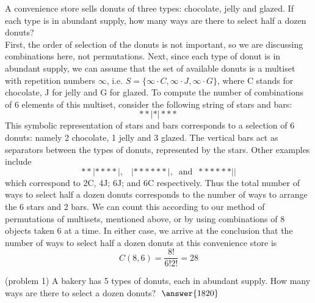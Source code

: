 \documentclass[handout]{ximera}
\begin{document}
\begin{example}[example 1]
A convenience store sells donuts of three types: chocolate, jelly and glazed.  If each type is in abundant supply,
how many ways are there to select half a dozen donuts?\\
First, the order of selection of the donuts is not important, so we are discussing combinations here, not permutations.
Next, since each type of donut is in abundant supply, we can assume that the set of available donuts is a multiset with repetition numbers $\infty$,
i.e. $S = \{\infty \cdot C, \infty \cdot J, \infty \cdot G\}$, where C stands for chocolate, J for jelly and G for glazed.
To compute the number of combinations of 6 elements of this multiset, consider the following string of stars and bars:
\[
**|*|***
\]
This symbolic representation of stars and bars corresponds to a selection of 6 donuts: namely 2 chocolate, 1 jelly and 3 glazed. The vertical bars act as separators between the types of donuts, represented by the stars. Other examples include
\[
**|****|, \;\;\; |******|, \;\; \mbox{and} \;\; ******||
\]
which correspond to 2C, 4J; 6J; and 6C respectively. Thus the total number of ways to select half a dozen donuts 
corresponds to the number of ways to arrange the 6 stars and 2 bars. We can count this according to our method of permutations of multisets, mentioned above, or by using combinations of 8 objects taken 6 at a time. In either case, we 
arrive at the conclusion that the number of ways to select half a dozen donuts at this convenience store is
\[
C(8,6) = \frac{8!}{6! 2!} = 28
\]
 
\end{example}


\begin{problem}(problem 1)
A bakery has 5 types of donuts, each in abundant supply. How many ways are there to select a dozen donuts?
$\; \answer{1820}$
\end{problem}
 
\end{document}
